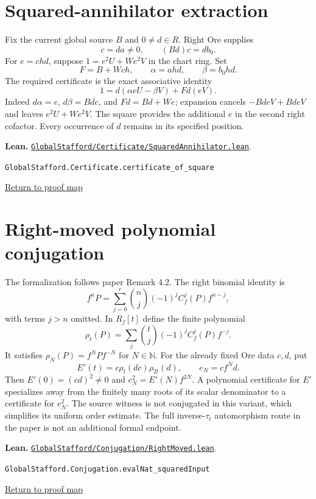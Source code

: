 \documentclass[11pt,a4paper]{article}
\newcommand{\code}[1]{\nolinkurl{#1}}
\newcommand{\backmap}{\hfill\hyperref[fig:map]{\small Return to proof map}}
\newcommand{\leanref}[2]{\par\smallskip\noindent\textbf{Lean.} \href{https://github.com/itpplasma/global-stafford-formal/blob/b21883a5b3d8f46922713049c3b060523ea3a771/#1}{\nolinkurl{#1}}.\par\noindent\small\code{#2}\par\normalsize\backmap}
\begin{document}
\section{Squared-annihilator extraction}\label{sec:square}
Fix the current global source $B$ and $0\ne d\in R$. Right Ore supplies
\[
 c=da\ne0,\qquad (Bd)c=db_0.
\]
For $e=chd$, suppose $1=e^2U+We^2V$ in the chart ring. Set
\[
 F=B+Wch,\qquad \alpha=ahd,\qquad\beta=b_0hd.
\]
The required certificate is the exact associative identity
\[
 1=d(\alpha eU-\beta V)+Fd(eV).
\]
Indeed $d\alpha=e$, $d\beta=Bde$, and $Fd=Bd+We$; expansion cancels
$-BdeV+BdeV$ and leaves $e^2U+We^2V$. The square provides the additional
$e$ in the second right cofactor. Every occurrence of $d$ remains in its
specified position.
\leanref{GlobalStafford/Certificate/SquaredAnnihilator.lean}{GlobalStafford.Certificate.certificate_of_square}

\section{Right-moved polynomial conjugation}\label{sec:rho}
The formalization follows paper Remark 4.2. The right binomial identity is
\[
 f^nP=\sum_{j=0}^{r}\binom nj(-1)^j C_f^j(P)f^{n-j},
\]
with terms $j>n$ omitted. In $R_f[t]$ define the finite polynomial
\[
 \rho_t(P)=\sum_j\binom tj(-1)^jC_f^j(P)f^{-j}.
\]
It satisfies $\rho_N(P)=f^NPf^{-N}$ for $N\in\mathbb N$. For the already fixed
Ore data $c,d$, put
\[
 E'(t)=c\rho_t(dc)\rho_{2t}(d),\qquad e_N=cf^Nd.
\]
Then $E'(0)=(cd)^2\ne0$ and $e_N^2=E'(N)f^{2N}$.
A polynomial certificate for $E'$ specializes away from the finitely many
roots of its scalar denominator to a certificate for $e_N^2$.
The source witness is not conjugated in this variant, which simplifies its
uniform order estimate. The full inverse-$\tau_t$ automorphism route in the
paper is not an additional formal endpoint.
\leanref{GlobalStafford/Conjugation/RightMoved.lean}{GlobalStafford.Conjugation.evalNat_squaredInput}
\end{document}
